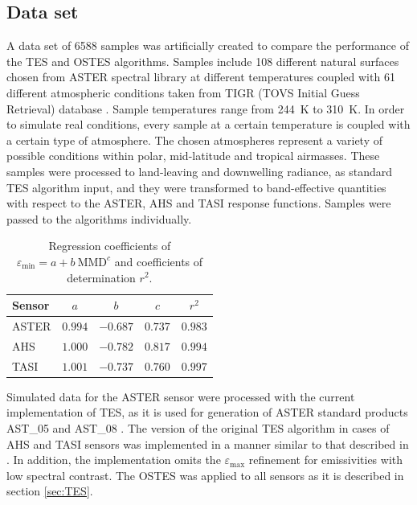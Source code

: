 \subsection*{Data set}

A data set of 6588 samples was artificially created to compare the performance of the TES and OSTES algorithms. Samples include 108 different natural surfaces chosen from ASTER spectral library \cite{BH09} at different temperatures coupled with 61 different atmospheric conditions taken from TIGR (TOVS Initial Guess Retrieval) database \cite{CS85, CC98}. Sample temperatures range from \SI{244}{\kelvin} to \SI{310}{\kelvin}. In order to simulate real conditions, every sample at a certain temperature is coupled with a certain type of atmosphere. The chosen atmospheres represent a variety of possible conditions within polar, mid-latitude and tropical airmasses. These samples were processed to land-leaving and downwelling radiance, as standard TES algorithm input, and they were transformed to band-effective quantities with respect to the ASTER, AHS and TASI response functions. Samples were passed to the algorithms individually.

\begin{table}[!t]
\vspace{0.5em}
\footnotesize
\centering
\begin{tabular}{lcccc}
\toprule
Sensor & $a$ & $b$ & $c$ & $r^2$\\ \hline
ASTER & $0.994$ & $-0.687$ & $0.737$ & $0.983$ \\
AHS & $1.000$ & $-0.782$ & $0.817$ & $0.994$ \\
TASI & $1.001$ & $-0.737$ & $0.760$ & $0.997$ \\
\bottomrule
\end{tabular}
\vspace{1.5 em}
\caption{Regression coefficients of $\varepsilon_\mathrm{min} = a + b\:\mathrm{MMD}^c$ and coefficients of determination $r^2$.}
\label{table:MMDcoef}
\normalsize
\end{table}

\newpage
Simulated data for the ASTER sensor were processed with the current implementation of TES, as it is used for generation of ASTER standard products AST\_05 and AST\_08 \cite{B15}. The version of the original TES algorithm in cases of AHS and TASI sensors was implemented in a manner similar to that described in \cite{JS12}. In addition, the implementation omits the $\varepsilon_\mathrm{max}$ refinement for emissivities with low spectral contrast. The OSTES was applied to all sensors as it is described in section \ref{sec:TES}.


